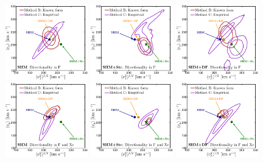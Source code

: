 \begin{figure}
\centering
	\includegraphics[width=0.32\textwidth]{Figures/vyvT-SHM-Xe-N-F-D.eps}
	\includegraphics[width=0.32\textwidth]{Figures/vyvT-STR-Xe-N-F-D.eps}
	\includegraphics[width=0.32\textwidth]{Figures/vyvT-DF-Xe-N-F-D.eps}
	\includegraphics[width=0.32\textwidth]{Figures/vyvT-SHM-Xe-D-F-D.eps}
	\includegraphics[width=0.32\textwidth]{Figures/vyvT-STR-Xe-D-F-D.eps}
	\includegraphics[width=0.32\textwidth]{Figures/vyvT-DF-Xe-D-F-D.eps}

\end{figure}
